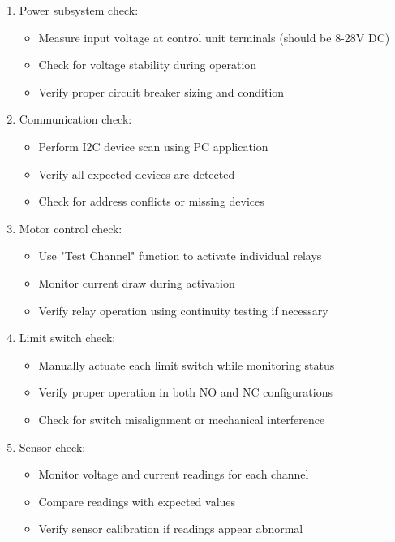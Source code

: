 \documentclass[12pt,a4paper,twoside,openright]{book}
\begin{document}
\begin{enumerate}
    \item Power subsystem check:
    \begin{itemize}
        \item Measure input voltage at control unit terminals (should be 8-28V DC)
        \item Check for voltage stability during operation
        \item Verify proper circuit breaker sizing and condition
    \end{itemize}
    
    \item Communication check:
    \begin{itemize}
        \item Perform I2C device scan using PC application
        \item Verify all expected devices are detected
        \item Check for address conflicts or missing devices
    \end{itemize}
    
    \item Motor control check:
    \begin{itemize}
        \item Use "Test Channel" function to activate individual relays
        \item Monitor current draw during activation
        \item Verify relay operation using continuity testing if necessary
    \end{itemize}
    
    \item Limit switch check:
    \begin{itemize}
        \item Manually actuate each limit switch while monitoring status
        \item Verify proper operation in both NO and NC configurations
        \item Check for switch misalignment or mechanical interference
    \end{itemize}
    
    \item Sensor check:
    \begin{itemize}
        \item Monitor voltage and current readings for each channel
        \item Compare readings with expected values
        \item Verify sensor calibration if readings appear abnormal
    \end{itemize}
\end{enumerate}
\end{document}
